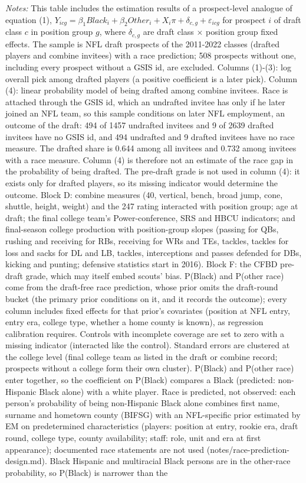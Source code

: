 {\footnotesize
\noindent\textit{Notes:} This table includes the estimation results of a prospect-level analogue of equation (1), $Y_{icg} = \beta_1 Black_i + \beta_2 Other_i + X_i\pi + \delta_{c,g} + \varepsilon_{icg}$ for prospect $i$ of draft class $c$ in position group $g$, where $\delta_{c,g}$ are draft class $\times$ position group fixed effects. The sample is NFL draft prospects of the 2011-2022 classes (drafted players and combine invitees) with a race prediction; 508 prospects without one, including every prospect without a GSIS id, are excluded. Columns (1)-(3): log overall pick among drafted players (a positive coefficient is a later pick). Column (4): linear probability model of being drafted among combine invitees. Race is attached through the GSIS id, which an undrafted invitee has only if he later joined an NFL team, so this sample conditions on later NFL employment, an outcome of the draft: 494 of 1457 undrafted invitees and 9 of 2639 drafted invitees have no GSIS id, and 494 undrafted and 9 drafted invitees have no race measure. The drafted share is 0.644 among all invitees and 0.732 among invitees with a race measure. Column (4) is therefore not an estimate of the race gap in the probability of being drafted. The pre-draft grade is not used in column (4): it exists only for drafted players, so its missing indicator would determine the outcome. Block D: combine measures (40, vertical, bench, broad jump, cone, shuttle, height, weight) and the 247 rating interacted with position group; age at draft; the final college team's Power-conference, SRS and HBCU indicators; and final-season college production with position-group slopes (passing for QBs, rushing and receiving for RBs, receiving for WRs and TEs, tackles, tackles for loss and sacks for DL and LB, tackles, interceptions and passes defended for DBs, kicking and punting; defensive statistics start in 2016). Block F: the CFBD pre-draft grade, which may itself embed scouts' bias. P(Black) and P(other race) come from the draft-free race prediction, whose prior omits the draft-round bucket (the primary prior conditions on it, and it records the outcome); every column includes fixed effects for that prior's covariates (position at NFL entry, entry era, college type, whether a home county is known), as regression calibration requires. Controls with incomplete coverage are set to zero with a missing indicator (interacted like the control). Standard errors are clustered at the college level (final college team as listed in the draft or combine record; prospects without a college form their own cluster). P(Black) and P(other race) enter together, so the coefficient on P(Black) compares a Black (predicted: non-Hispanic Black alone) with a white player. Race is predicted, not observed: each person's probability of being non-Hispanic Black alone combines first name, surname and hometown county (BIFSG) with an NFL-specific prior estimated by EM on predetermined characteristics (players: position at entry, rookie era, draft round, college type, county availability; staff: role, unit and era at first appearance); documented race statements are not used (notes/race-prediction-design.md). Black Hispanic and multiracial Black persons are in the other-race probability, so P(Black) is narrower than the }
